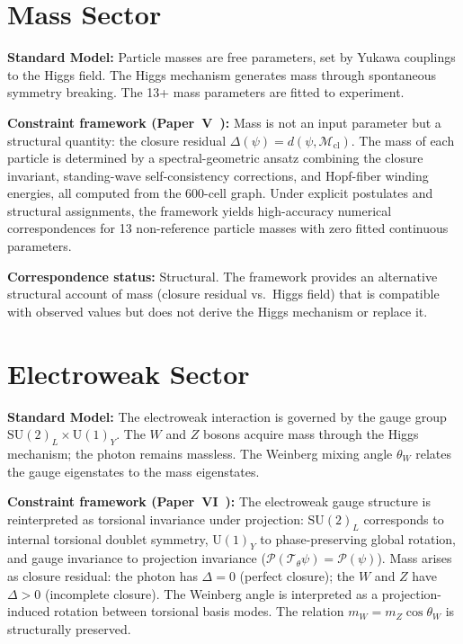 \documentclass[12pt]{article}
\newcommand{\Mcl}{\mathcal{M}_{\mathrm{cl}}}
\newcommand{\Pcal}{\mathcal{P}}
\newcommand{\Tcal}{\mathcal{T}}
\begin{document}
\section{Mass Sector}\label{sec:mass}

\textbf{Standard Model:} Particle masses are free parameters, set by Yukawa couplings to the Higgs field. The Higgs mechanism generates mass through spontaneous symmetry breaking. The 13+ mass parameters are fitted to experiment.

\textbf{Constraint framework (Paper~V~\citep{SmartV}):} Mass is not an input parameter but a structural quantity: the closure residual $\Delta(\psi) = d(\psi, \Mcl)$. The mass of each particle is determined by a spectral-geometric ansatz combining the closure invariant, standing-wave self-consistency corrections, and Hopf-fiber winding energies, all computed from the 600-cell graph. Under explicit postulates and structural assignments, the framework yields high-accuracy numerical correspondences for 13 non-reference particle masses with zero fitted continuous parameters.

\textbf{Correspondence status:} Structural. The framework provides an alternative structural account of mass (closure residual vs.\ Higgs field) that is compatible with observed values but does not derive the Higgs mechanism or replace it.

\section{Electroweak Sector}\label{sec:ew}

\textbf{Standard Model:} The electroweak interaction is governed by the gauge group $\mathrm{SU}(2)_L \times \mathrm{U}(1)_Y$. The $W$ and $Z$ bosons acquire mass through the Higgs mechanism; the photon remains massless. The Weinberg mixing angle $\theta_W$ relates the gauge eigenstates to the mass eigenstates.

\textbf{Constraint framework (Paper~VI~\citep{SmartVI}):} The electroweak gauge structure is reinterpreted as torsional invariance under projection: $\mathrm{SU}(2)_L$ corresponds to internal torsional doublet symmetry, $\mathrm{U}(1)_Y$ to phase-preserving global rotation, and gauge invariance to projection invariance ($\Pcal(\Tcal_\theta\psi) = \Pcal(\psi)$). Mass arises as closure residual: the photon has $\Delta = 0$ (perfect closure); the $W$ and $Z$ have $\Delta > 0$ (incomplete closure). The Weinberg angle is interpreted as a projection-induced rotation between torsional basis modes. The relation $m_W = m_Z \cos\theta_W$ is structurally preserved.
\end{document}
